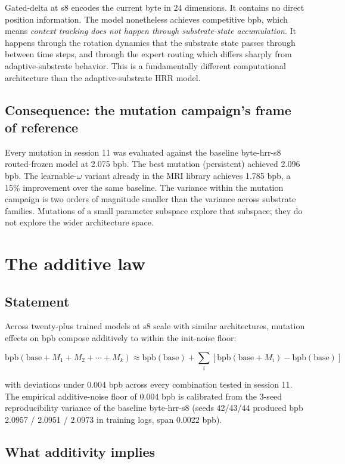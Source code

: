 \documentclass[11pt,openany]{book}
\begin{document}
Gated-delta at s8 encodes the current byte in 24 dimensions. It
contains no direct position information. The model nonetheless
achieves competitive bpb, which means \emph{context tracking does not
happen through substrate-state accumulation}. It happens through the
rotation dynamics that the substrate state passes through between time
steps, and through the expert routing which differs sharply from
adaptive-substrate behavior. This is a fundamentally different
computational architecture than the adaptive-substrate HRR model.

\section{Consequence: the mutation campaign's frame of reference}

Every mutation in session 11 was evaluated against the baseline
byte-hrr-s8 routed-frozen model at 2.075 bpb. The best mutation
(persistent) achieved 2.096 bpb. The learnable-$\omega$ variant
already in the MRI library achieves 1.785 bpb, a 15\% improvement
over the same baseline. The variance within the mutation campaign is
two orders of magnitude smaller than the variance across substrate
families. Mutations of a small parameter subspace explore that
subspace; they do not explore the wider architecture space.

\chapter{The additive law}

\section{Statement}

Across twenty-plus trained models at s8 scale with similar
architectures, mutation effects on bpb compose additively to within
the init-noise floor:

\[
\mathrm{bpb}(\mathrm{base} + M_1 + M_2 + \cdots + M_k) \approx
\mathrm{bpb}(\mathrm{base}) + \sum_i [\mathrm{bpb}(\mathrm{base} + M_i)
- \mathrm{bpb}(\mathrm{base})]
\]

with deviations under 0.004 bpb across every combination tested in
session 11. The empirical additive-noise floor of 0.004 bpb is
calibrated from the 3-seed reproducibility variance of the baseline
byte-hrr-s8 (seeds 42/43/44 produced bpb 2.0957 / 2.0951 / 2.0973 in
training logs, span 0.0022 bpb).

\section{What additivity implies}
\end{document}
